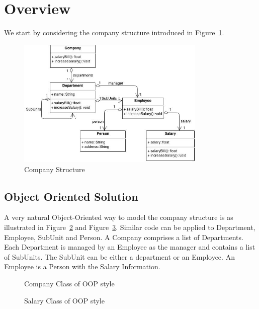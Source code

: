 \section{Overview}\label{subsec:overview}
We start by considering the company structure introduced in Figure~\ref{company_structure}.

\begin{figure}[ht!]
\centering
\includegraphics[width=90mm]{Company.jpg}
\caption{Company Structure \label{company_structure}}
\end{figure}

\subsection{Object Oriented Solution}

A very natural Object-Oriented way to model the company structure is as illustrated in Figure~\ref{oop_company} and Figure~\ref{oop_salary}. Similar code can be applied to Department, Employee, SubUnit and Person. A Company comprises a list of Departments. Each Department is managed by an Employee as the manager and contains a list of SubUnits. The SubUnit can be either a department or an Employee. An Employee is a Person with the Salary Information. 

\begin{figure}[tb]
\vspace{-.1in}
\caption{Company Class of OOP style}
\label{oop_company}
\end{figure}

\begin{figure}[tb]
\vspace{-.1in}
\caption{Salary Class of OOP style}
\label{oop_salary}
\end{figure}

